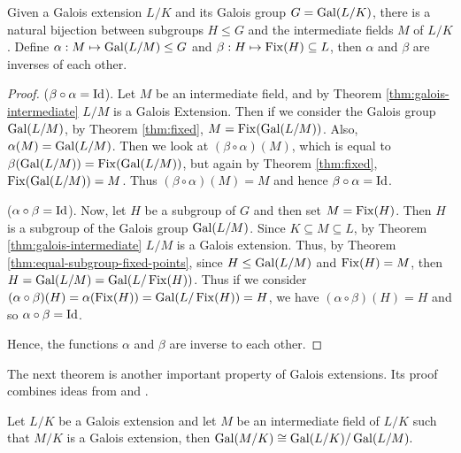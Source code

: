 \begin{theorem} \label{thm:fundamental-theorem} Given a Galois extension $L/K$ and its Galois group $G = \operatorname{Gal}(L/K)$, there is a natural bijection between subgroups $H\leq G$ and the intermediate fields $M$ of $L/K$. Define
 $\alpha:M \mapsto \operatorname{Gal}(L/M) \leq G$ and
 $\beta:H \mapsto \operatorname{Fix}(H) \subseteq L$,
then $\alpha$ and $\beta$ are inverses of each other.
\end{theorem}
\begin{proof}

($\beta \circ \alpha = \operatorname{Id}$). Let $M$ be an intermediate field, and by Theorem \ref{thm:galois-intermediate} $L/M$ is a Galois Extension. Then if we consider the Galois group $\operatorname{Gal}(L/M)$, by Theorem \ref{thm:fixed}, $M = \operatorname{Fix}(\operatorname{Gal}(L/M))$. Also, $\alpha(M) = \operatorname{Gal}(L/M)$. Then we look at $(\beta \circ \alpha)(M)$, which is equal to $\beta(\operatorname{Gal}(L/M)) = \operatorname{Fix}(\operatorname{Gal}(L/M))$, but again by Theorem \ref{thm:fixed}, $\operatorname{Fix}(\operatorname{Gal}(L/M)) = M$. Thus $(\beta \circ \alpha)(M) = M$ and hence $\beta \circ \alpha = \operatorname{Id}$.

($\alpha \circ \beta = \operatorname{Id}$). Now, let $H$ be a subgroup of $G$ and then set $M =\operatorname{Fix}(H)$. Then $H$ is a subgroup of the Galois group $\operatorname{Gal}(L/M)$. Since $K \subseteq M \subseteq L$, by Theorem \ref{thm:galois-intermediate} $L/M$ is a Galois extension. Thus, by Theorem \ref{thm:equal-subgroup-fixed-points}, since $H\leq \operatorname{Gal}(L/M)$ and $\operatorname{Fix}(H)=M$, then $H=\operatorname{Gal}(L/M)=\operatorname{Gal}(L/\operatorname{Fix}(H))$. Thus if we consider $(\alpha \circ \beta)(H) = \alpha(\operatorname{Fix}(H)) = \operatorname{Gal}(L/\operatorname{Fix}(H))= H $, we have $(\alpha \circ \beta)(H) = H$ and so $\alpha \circ \beta = \operatorname{Id}$.

Hence, the functions $\alpha$ and $\beta$ are inverse to each other.
\end{proof}

The next theorem is another important property of Galois extensions. Its proof combines ideas from \cite[Chapter~12]{Stewart} and \cite[p.~58-62]{rotman_galois_1998}. 
\begin{theorem} \label{thm:correspondence-quotient}
    Let $L / K$ be a Galois extension and let $M$ be an intermediate field of $L/K$ such that $M /K$ is a Galois extension, then 
    $\operatorname{Gal}(M / K) \cong \operatorname{Gal}(L / K) / \operatorname{Gal}(L / M). $
\end{theorem}

